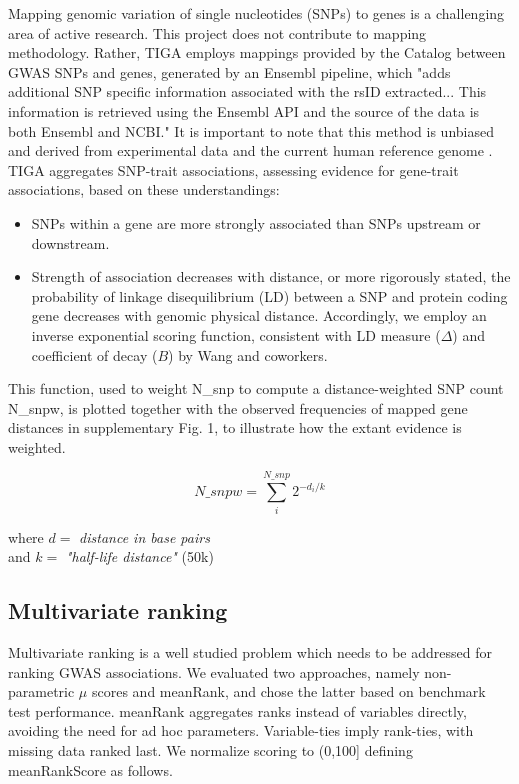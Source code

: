 Mapping  genomic  variation  of  single  nucleotides  (SNPs)  to  genes  is  a  challenging  area  of active  research\cite{Liu2010-fe,Mishra2015-rm,Lamparter2016-zb}.  This project  does not contribute to mapping methodology.  Rather, TIGA employs mappings provided by the Catalog between GWAS SNPs and genes,  generated by an Ensembl pipeline, which "adds additional SNP specific information associated with the rsID extracted... This information is retrieved using the Ensembl API and the source of the data is both Ensembl and NCBI."\cite{The_NHGRI-EBI_GWAS_Catalog_undated-kl} It is important to note that this method is unbiased and derived from experimental data and the current human reference genome . TIGA aggregates SNP-trait associations, assessing evidence for gene-trait associations, based on these understandings:

\begin{itemize}
\item SNPs within a gene are more strongly associated than SNPs upstream or downstream.
\item Strength of association decreases with distance, or more rigorously stated, the probability of linkage disequilibrium (LD) between a SNP and protein coding gene decreases with genomic physical distance. Accordingly, we employ an inverse exponential scoring function, consistent with LD measure ($\Delta$) and coefficient of decay ($B$) by Wang and coworkers\cite{Wang2006-ja}. 
\end{itemize}

This function, used to weight N\_snp to compute a distance-weighted SNP count N\_snpw, is plotted together with the observed frequencies of mapped gene distances in supplementary Fig. 1, to illustrate how the extant evidence is weighted. 

\begin{equation}
    N\_snpw = \sum_{i}^{N\_snp}  2^{-d_{i}/k}
\end{equation}

\begin{center}
    where $ d = $ \emph{distance in base pairs} \\
    and $ k = $ \emph{"half-life distance"} (50k)
\end{center}

\subsection{Multivariate ranking}

Multivariate ranking is a well studied problem which needs to be addressed for ranking GWAS associations. We evaluated two approaches, namely non-parametric $\mu$ scores\cite{Wittkowski2008-mz} and meanRank, and chose the latter based on benchmark test performance. meanRank aggregates ranks instead of variables directly, avoiding the need for ad hoc parameters. Variable-ties imply rank-ties, with missing data ranked last. We normalize scoring to (0,100] defining meanRankScore as follows.

